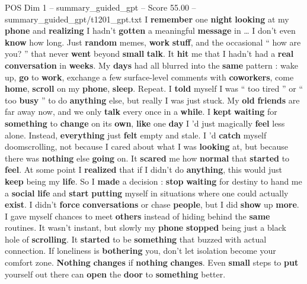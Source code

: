 \begin{textsample}{POS Dim 1 – summary\_guided\_gpt – Score 55.00 – summary\_guided\_gpt/t1201\_gpt.txt}  \label{ex:f1_pos_022}
I \textbf{remember} one \textbf{night} \textbf{looking} at my \textbf{phone} and \textbf{realizing} I hadn't \textbf{gotten} a meaningful \textbf{message} in … I don't even \textbf{know} how long.
Just \textbf{random} memes, \textbf{work} \textbf{stuff}, and the occasional “ how are you? ” that never \textbf{went} beyond \textbf{small} \textbf{talk}.
It \textbf{hit} me that I hadn't had a \textbf{real} \textbf{conversation} in \textbf{weeks}.
My \textbf{days} had all blurred into the \textbf{same} pattern : wake up, \textbf{go} to \textbf{work}, exchange a few surface-level comments with \textbf{coworkers}, come \textbf{home}, \textbf{scroll} on my \textbf{phone}, \textbf{sleep}.
Repeat.
I \textbf{told} myself I was “ too tired ” or “ too \textbf{busy} ” to do \textbf{anything} else, but really I was just stuck.
My \textbf{old} \textbf{friends} are far away now, and we only \textbf{talk} every once in a \textbf{while}.
I \textbf{kept} \textbf{waiting} for \textbf{something} to \textbf{change} on its \textbf{own}, \textbf{like} one \textbf{day} I ’d just magically \textbf{feel} less alone.
Instead, \textbf{everything} just \textbf{felt} empty and stale.
I ’d \textbf{catch} myself doomscrolling, not because I cared about what I was \textbf{looking} at, but because there was \textbf{nothing} else \textbf{going} on.
It \textbf{scared} me how \textbf{normal} that \textbf{started} to \textbf{feel}.
At some point I \textbf{realized} that if I didn't do \textbf{anything}, this would just \textbf{keep} being my \textbf{life}.
So I \textbf{made} a decision : \textbf{stop} \textbf{waiting} for destiny to hand me a \textbf{social} \textbf{life} and \textbf{start} \textbf{putting} myself in situations where one could actually \textbf{exist}.
I didn't \textbf{force} \textbf{conversations} or chase \textbf{people}, but I did \textbf{show} up \textbf{more}.
I gave myself chances to meet \textbf{others} instead of hiding behind the \textbf{same} routines.
It wasn't instant, but slowly my \textbf{phone} \textbf{stopped} being just a black hole of \textbf{scrolling}.
It \textbf{started} to be \textbf{something} that buzzed with actual connection.
If loneliness is \textbf{bothering} you, don't let isolation become your comfort zone. \textbf{Nothing} \textbf{changes} if \textbf{nothing} \textbf{changes}.
Even \textbf{small} steps to \textbf{put} yourself out there can \textbf{open} the \textbf{door} to \textbf{something} better.

\end{textsample}
